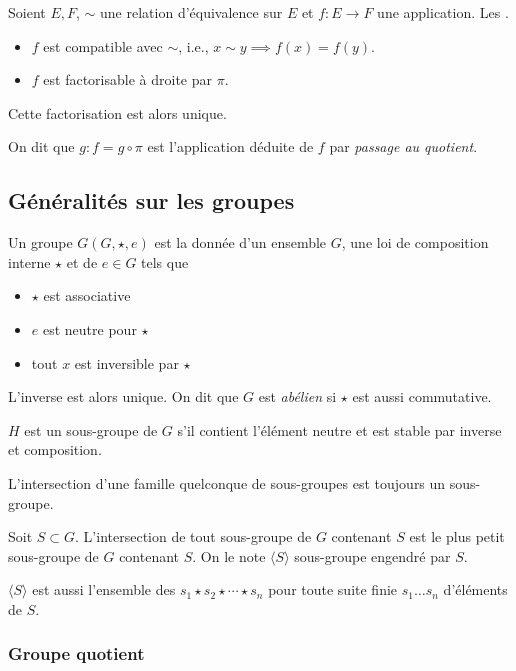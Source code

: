 \documentclass[a4paper,11pt,twocolumn]{article}
\begin{document}
     Soient $E,F$, $\sim$ une relation d'équivalence sur $E$ et $f:E\rightarrow F$ une application. Les \Asse{}.
    \begin{itemize}
      \item $f$ est compatible avec $\sim$, i.e., $x\sim y \implies f(x)=f(y)$.
      \item $f$ est factorisable à droite par $\pi$.
    \end{itemize}

    Cette factorisation est alors unique.

     On dit que $g: f=g\circ\pi$ est l'application déduite de $f$ par \emph{passage au quotient}.

  \subsection{Généralités sur les groupes}

     Un groupe $G (G,\star,e)$ est la donnée d'un ensemble $G$, une loi de composition interne $\star$ et de $e\in G$ tels que
    \begin{itemize}
      \item $\star$ est associative
      \item $e$ est neutre pour $\star$
      \item tout $x$ est inversible par $\star$
    \end{itemize}
    L'inverse est alors unique. On dit que $G$ est \emph{abélien} si $\star$ est aussi commutative.

     $H$ est un sous-groupe de $G$ s'il contient l'élément neutre et est stable par inverse et composition.

     L'intersection d'une famille quelconque de sous-groupes est toujours un sous-groupe.

     Soit $S\subset G$. L'intersection de tout sous-groupe de $G$ contenant $S$ est le plus petit sous-groupe de $G$ contenant $S$. On le note $\langle S\rangle$ sous-groupe engendré par $S$.

    $\langle S\rangle$ est aussi l'ensemble des $s_1\star s_2\star\cdots\star s_n$ pour toute suite finie $s_1\ldots s_n$ d'éléments de $S$.

    \subsubsection{Groupe quotient}
\end{document}
